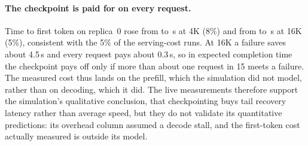 \documentclass[10pt,twocolumn]{article}
\begin{document}
\paragraph{The checkpoint is paid for on every request.} Time to first token
on replica~0 rose from \PfbFourNoneTtft{} to \PfbFourPromptTtft\,s at 4K
(8\%) and from \PfbSixteenNoneTtft{} to \PfbSixteenPromptTtft\,s at 16K (5\%),
consistent with the 5\% of the serving-cost runs. At 16K a failure saves about
4.5\,s and every request pays about 0.3\,s, so in expected completion time the
checkpoint pays off only if more than about one request in 15 meets a failure.
The measured cost thus lands on the prefill, which the simulation did not
model, rather than on decoding, which it did. The live measurements therefore
support the simulation's qualitative conclusion, that checkpointing buys tail
recovery latency rather than average speed, but they do not validate its
quantitative predictions: its overhead column assumed a decode stall, and the
first-token cost actually measured is outside its model.
\end{document}
